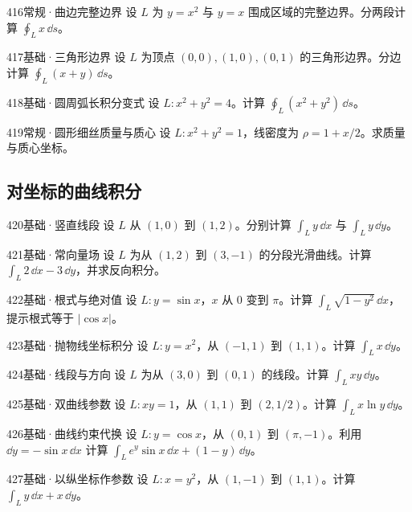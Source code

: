 \begin{exercise}{416}{常规·曲边完整边界}
设 $L$ 为 $y=x^2$ 与 $y=x$ 围成区域的完整边界。分两段计算 $\oint_Lx\,\dd s$。
\end{exercise}
\begin{exercise}{417}{基础·三角形边界}
设 $L$ 为顶点 $(0,0),(1,0),(0,1)$ 的三角形边界。分边计算 $\oint_L(x+y)\,\dd s$。
\end{exercise}
\begin{exercise}{418}{基础·圆周弧长积分变式}
设 $L:x^2+y^2=4$。计算 $\oint_L(x^2+y^2)\,\dd s$。
\end{exercise}
\begin{exercise}{419}{常规·圆形细丝质量与质心}
设 $L:x^2+y^2=1$，线密度为 $\rho=1+x/2$。求质量与质心坐标。
\end{exercise}
\subsection{对坐标的曲线积分}
\begin{exercise}{420}{基础·竖直线段}
设 $L$ 从 $(1,0)$ 到 $(1,2)$。分别计算 $\int_Ly\,\dd x$ 与 $\int_Ly\,\dd y$。
\end{exercise}
\begin{exercise}{421}{基础·常向量场}
设 $L$ 为从 $(1,2)$ 到 $(3,-1)$ 的分段光滑曲线。计算 $\int_L2\,\dd x-3\,\dd y$，并求反向积分。
\end{exercise}
\begin{exercise}{422}{基础·根式与绝对值}
设 $L:y=\sin x$，$x$ 从 $0$ 变到 $\pi$。计算 $\int_L\sqrt{1-y^2}\,\dd x$，提示根式等于 $|\cos x|$。
\end{exercise}
\begin{exercise}{423}{基础·抛物线坐标积分}
设 $L:y=x^2$，从 $(-1,1)$ 到 $(1,1)$。计算 $\int_Lx\,\dd y$。
\end{exercise}
\begin{exercise}{424}{基础·线段与方向}
设 $L$ 为从 $(3,0)$ 到 $(0,1)$ 的线段。计算 $\int_Lxy\,\dd y$。
\end{exercise}
\begin{exercise}{425}{基础·双曲线参数}
设 $L:xy=1$，从 $(1,1)$ 到 $(2,1/2)$。计算 $\int_Lx\ln y\,\dd y$。
\end{exercise}
\begin{exercise}{426}{基础·曲线约束代换}
设 $L:y=\cos x$，从 $(0,1)$ 到 $(\pi,-1)$。利用 $\dd y=-\sin x\,\dd x$ 计算 $\int_Le^y\sin x\,\dd x+(1-y)\,\dd y$。
\end{exercise}
\begin{exercise}{427}{基础·以纵坐标作参数}
设 $L:x=y^2$，从 $(1,-1)$ 到 $(1,1)$。计算 $\int_Ly\,\dd x+x\,\dd y$。
\end{exercise}
